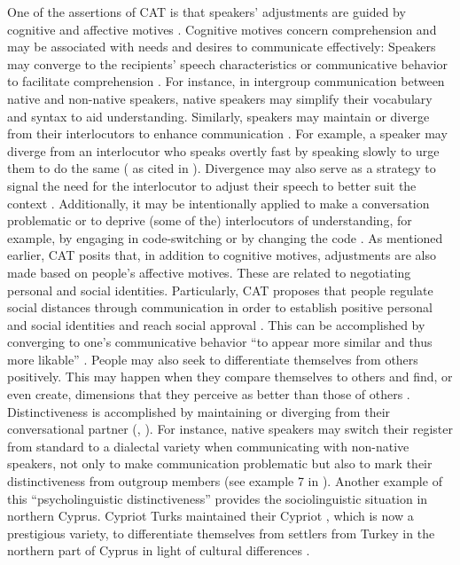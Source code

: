 \documentclass[output=paper,colorlinks,citecolor=brown]{langscibook}
\begin{document}
One of the assertions of CAT is that speakers' adjustments are guided by cognitive and affective motives \citep{gallois_ogay_giles2005}. Cognitive motives concern comprehension and may be associated with needs and desires to communicate effectively: Speakers may converge to the recipients' speech characteristics or communicative behavior to facilitate comprehension \citep{dragojevic_gasiorek_giles2016,gallois_ogay_giles2005}. For instance, in intergroup communication between native and non-native speakers, native speakers may simplify their vocabulary and syntax \citep{petrou_dragojevic2024,zuengler1991} to aid understanding. Similarly, speakers may maintain or diverge from their interlocutors to enhance communication \citep{dragojevic_gasiorek_giles2016,gallois_ogay_giles2005}. For example, a speaker may diverge from an interlocutor who speaks overtly fast by speaking slowly to urge them to do the same (\citealt{brown_giles_thakerar1985} as cited in \citealt{dragojevic_gasiorek_giles2016}). Divergence may also serve as a strategy to signal the need for the interlocutor to adjust their speech to better suit the context \citep{gallois_ogay_giles2005}. Additionally, it may be intentionally applied to make a conversation problematic or to deprive (some of the) interlocutors of understanding, for example, by engaging in code-switching \citep{gasiorek2016a,dragojevic_gasiorek_giles2016} or by changing the code \citep{petrou2023}.
As mentioned earlier, CAT posits that, in addition to cognitive motives, adjustments are also made based on people's affective motives. These are related to negotiating personal and social identities. Particularly, CAT proposes that people regulate social distances through communication in order to establish positive personal and social identities and reach social approval \citep{dragojevic_gasiorek_giles2016,giles_coupland_coupland1991}. This can be accomplished by converging to one's communicative behavior ``to appear more similar and thus more likable'' \citep[126]{gallois_ogay_giles2005}. People may also seek to differentiate themselves from others positively. This may happen when they compare themselves to others and find, or even create, dimensions that they perceive as better than those of others \citep{tajfel1974}. Distinctiveness is accomplished by maintaining or diverging from their conversational partner (\citealt[126]{gallois_ogay_giles2005}, \citealt{dragojevic_gasiorek_giles2016}). For instance, native speakers may switch their register from standard to a dialectal variety when communicating with non-native speakers, not only to make communication problematic but also to mark their distinctiveness from outgroup members (see example 7 in \citealt[140]{petrou2023}). Another example of this ``psycholinguistic distinctiveness'' \citep{giles_bourhis_taylor1977} provides the sociolinguistic situation in northern Cyprus. Cypriot Turks maintained their Cypriot  , which is now a prestigious variety, to differentiate themselves from settlers from Turkey in the northern part of Cyprus in light of cultural differences \citep{kizilyurek_gautier-kizilyurek2004,petrou2023}.
\end{document}
